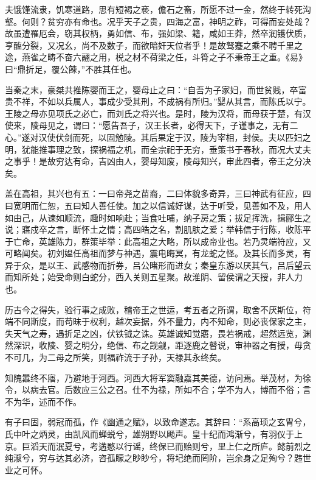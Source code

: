 \documentclass[12pt,UTF8]{ctexbook}
\begin{document}
夫饿馑流隶，饥寒道路，思有短褐之亵，儋石之畜，所愿不过一金，然终于转死沟壑。何则？贫穷亦有命也。况乎天子之贵，四海之富，神明之祚，可得而妄处哉？故虽遭罹厄会，窃其权柄，勇如信、布，强如梁、籍，咸如王莽，然卒润镬伏质，亨醢分裂，又况幺，尚不及数子，而欲暗奸天位者乎！是故驽蹇之乘不聘千里之途，燕雀之畴不奋六翮之用，棁之材不荷梁之任，斗筲之子不秉帝王之重。《易》曰“鼎折足，覆公餗，”不胜其任也。



当秦之末，豪桀共推陈婴而王之，婴母止之曰：“自吾为子家妇，而世贫贱，卒富贵不祥，不如以兵属人，事成少受其刑，不成祸有所归。”婴从其言，而陈氏以宁。王陵之母亦见项氏之必亡，而刘氏之将兴也。是时，陵为汉将，而母获于楚，有汉使来，陵母见之，谓曰：“愿告吾子，汉王长者，必得天下，子谨事之，无有二心。”遂对汉使伏剑而死，以固勉陵。其后果定于汉，陵为宰相，封侯。夫以匹妇之明，犹能推事理之致，探祸福之机，而全宗祀于无穷，垂策书于春秋，而况大丈夫之事乎！是故穷达有命，吉凶由人，婴母知废，陵母知兴，审此四者，帝王之分决矣。



盖在高祖，其兴也有五：一曰帝尧之苗裔，二曰体貌多奇异，三曰神武有征应，四曰宽明而仁恕，五曰知人善任使。加之以信诚好谋，达于听受，见善如不及，用人如由己，从谏如顺流，趣时如响赴；当食吐哺，纳子房之策；拔足挥洗，揖郦生之说；寤戍卒之言，断怀土之情；高四皓之名，割肌肤之爱；举韩信于行陈，收陈平于亡命，英雄陈力，群策毕举：此高祖之大略，所以成帝业也。若乃灵端符应，又可略闻矣。初刘媪任高祖而梦与神遇，震电晦冥，有龙蛇之怪。及其长而多灵，有异于众，是以王、武感物而折券，吕公睹形而进女；秦皇东游以厌其气，吕后望云而知所处；始受命则白蛇分，西入关则五星聚。故淮阴、留侯谓之天授，非人力也。



历古今之得失，验行事之成败，稽帝王之世运，考五者之所谓，取舍不厌斯位，符端不同斯度，而苟昧于权利，越次妄据，外不量力，内不知命，则必丧保家之主，失天气之寿，遇折足之凶，伏铁钺之诛。英雄诚知觉寤，畏若祸戒，超然远览，渊然深识，收陵、婴之明分，绝信、布之觊觎，距逐鹿之瞽说，审神器之有授，毋贪不可几，为二母之所笑，则福祚流于子孙，天禄其永终矣。



知隗嚣终不寤，乃避地于河西。河西大将军窦融嘉其美德，访问焉。举茂材，为徐令，以病去官。后数应三公之召。仕不为禄，所如不合；学不为人，博而不俗；言不为华，述而不作。



有子曰固，弱冠而孤，作《幽通之赋》，以致命遂志。其辞曰：“系高顼之玄胄兮，氏中叶之炳灵，由凯风而蝉蜕兮，雄朔野以飏声。皇十纪而鸿渐兮，有羽仪于上京。巨滔天而泯夏兮，考遘愍以行谣，终保已而贻则兮，里上仁之所庐。懿前烈之纯淑兮，穷与达其必济，咨孤矇之眇眇兮，将圮绝而罔阶，岂余身之足殉兮？韪世业之可怀。
\end{document}
